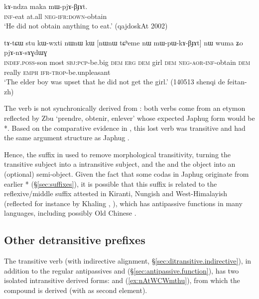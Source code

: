 \begin{exe}
\ex \label{ex:mWpjABJAt}
\gll kɤ-ndza maka mɯ-pjɤ-βɟɤt.   \\
\textsc{inf}-eat at.all \textsc{neg}-\textsc{ifr}:\textsc{down}-obtain \\
\glt `He did not obtain anything to eat.' (qajdoskAt 2002)
\end{exe}

\begin{exe}
\ex \label{ex:mWpWkABJAt}
\gll tɤ-tɕɯ stu kɯ-wxti nɯnɯ kɯ [nɯnɯ tɕʰeme nɯ mɯ-pɯ-kɤ-βɟɤt] nɯ wuma ʑo pjɤ-nɤ-sɤɣdɯɣ  \\
\textsc{indef}.\textsc{poss}-son most \textsc{sbj}:\textsc{pcp}-be.big \textsc{dem} \textsc{erg} \textsc{dem} girl \textsc{dem} \textsc{neg}-\textsc{aor}-\textsc{inf}-obtain \textsc{dem} really \textsc{emph} \textsc{ifr}-\textsc{trop}-be.unpleasant \\
\glt `The elder boy was upset that he did not get the girl.' (140513 shenqi de feitan-zh) 
\end{exe}

The verb  is not synchronically derived from : both verbs come from an etymon reflected by Zbu  `prendre, obtenir, enlever' \citep[310]{gong18these} whose expected Japhug form would be *. Based on the comparative evidence in \citet[310--311]{gong18these}, this lost verb was transitive and had the same argument structure as Japhug . 
 
Hence, the  suffix in  used to remove morphological transitivity, turning the transitive subject into a intransitive subject, and the and the object into an (optional) semi-object. Given the fact that some  codas in Japhug originate from earlier * (§\ref{sec:suffixes}), it is possible that this  suffix is related to the reflexive/middle suffix attested in Kiranti, Nungish and West-Himalayish (reflected for instance by Khaling , \citealt{jacques16si}), which has antipassive functions in many languages, including possibly Old Chinese \citep{jacques21antipass}.
 
 \subsection{Other detransitive prefixes} \label{sec:CWmthu}
 The transitive verb  (with indirective alignment, §\ref{sec:ditransitive.indirective}), in addition to the regular antipassives  and  (§\ref{sec:antipassive.function}), has two isolated intransitive derived forms:  and   (\ref{ex:nAtWCWmthu}), from which the compound  is derived (with  as second element).
 
